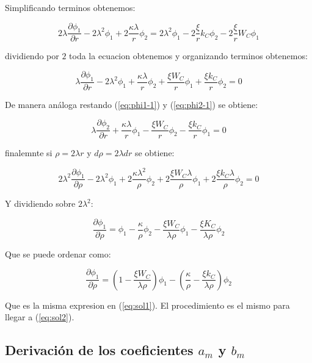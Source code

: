 \documentclass[a4paper, 12pt]{article} %
\begin{document}
Simplificando terminos obtenemos:

\[
 2 \lambda \dfrac{\partial \phi_1}{\partial r} -  2 \lambda^2  \phi_1 + 2\dfrac{\kappa \lambda}{r}\phi_2
= 2\lambda^2 \phi_1 - 2 \dfrac{\xi}{r}k_C \phi_2 - 2\dfrac{\xi}{r}W_C \phi_1
\]

dividiendo por $2$ toda la ecuacion obtenemos y organizando terminos obtenemos:

\begin{equation}
\lambda \dfrac{\partial \phi_1}{\partial r} - 2 \lambda^2 \phi_1 + \dfrac{\kappa \lambda}{r} \phi_2  + \dfrac{\xi W_C}{r} \phi_1 
+ \dfrac{\xi k_C}{r}\phi_2 = 0
\end{equation}

De manera an\'aloga restando (\ref{eq:phi1-1}) y  (\ref{eq:phi2-1}) se obtiene:

\begin{equation}
\lambda \dfrac{\partial \phi_2}{\partial r}  + \dfrac{\kappa \lambda}{r} \phi_1  - \dfrac{\xi W_C}{r} \phi_2 - \dfrac{\xi k_C}{r} \phi_1 = 0
\end{equation}

finalemnte si $\rho = 2\lambda r$ y $d\rho = 2 \lambda dr$ se obtiene:

\[
2\lambda^2 \dfrac{\partial \phi_1}{\partial \rho} - 2\lambda^2 \phi_1 + 2 \dfrac{\kappa \lambda^2 }{\rho} \phi_2 
+ 2 \dfrac{\xi W_C \lambda}{\rho}\phi_1 + 2\dfrac{\xi k_C \lambda }{\rho}\phi_2 = 0
\]

Y dividiendo sobre $2\lambda^2$:

\[
\dfrac{\partial \phi_1}{\partial \rho} = \phi_1 - \dfrac{\kappa}{\rho}\phi_2 - \dfrac{\xi W_C}{\lambda \rho }\phi_1 - \dfrac{\xi K_C}{\lambda \rho}
\phi_2 
\]

Que se puede ordenar como:

\begin{equation}
\dfrac{\partial \phi_1}{\partial \rho} = \left( 1 - \dfrac{\xi W_C}{\lambda \rho} \right) \phi_1 
- \left( \dfrac{\kappa}{\rho} - \dfrac{\xi k_C}{\lambda \rho} \right) \phi_2
\end{equation}

Que es la misma expresion en (\ref{eq:sol1}). El procedimiento es el mismo para llegar a (\ref{eq:sol2}).

\subsection{Derivaci\'on de los coeficientes $a_m$ y $b_m$}
\end{document}
